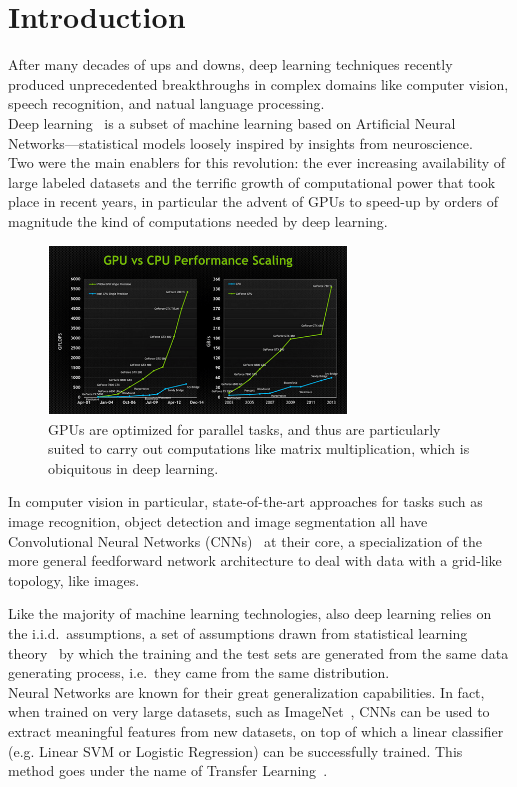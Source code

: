 \documentclass[../main.tex]{subfiles}
\begin{document}
    \chapter{Introduction}\label{chap:intro}
    \setcounter{page}{1}

    After many decades of ups and downs, deep learning techniques recently produced unprecedented breakthroughs
    in complex domains like computer vision, speech recognition, and natual language processing. \\
    Deep learning~\cite{deeplearning} is a subset of machine learning based on Artificial Neural Networks---statistical models loosely
    inspired by insights from neuroscience. \\
    Two were the main enablers for this revolution: the ever increasing availability of large labeled
    datasets and the terrific growth of computational power that took place in recent years, in particular
    the advent of GPUs to speed-up by orders of magnitude the kind of computations needed by deep learning.

    \begin{figure}[h!]
        \centering{}
        \includegraphics[width=300px]{img/gpu-vs-cpu.png}
        \caption{GPUs are optimized for parallel tasks, and thus are particularly suited to carry out computations
        like matrix multiplication, which is obiquitous in deep learning.}\label{fig:gpu-vs-cpu}
    \end{figure}

    In computer vision in particular, state-of-the-art approaches for tasks such as image recognition,
    object detection and image segmentation all have Convolutional Neural Networks (CNNs)~\cite{lecun-89e} at their core,
	a specialization of the more general feedforward network architecture to deal with data with a grid-like topology,
    like images.

    Like the majority of machine learning technologies, also deep learning relies on the i.i.d.\ assumptions,
    a set of assumptions drawn from statistical learning theory~\cite{Vapnik1998} by which the training and the test sets are generated
    from the same data generating process, i.e.\ they came from the same distribution. \\
    Neural Networks are known for their great generalization capabilities. In fact, when trained on very large
    datasets, such as ImageNet~\cite{imagenet}, CNNs can be used to extract meaningful features from new datasets, on top of which
    a linear classifier (e.g. Linear SVM or Logistic Regression) can be successfully trained.
    This method goes under the name of Transfer Learning~\cite{transfer-learning}. \\
\end{document}
